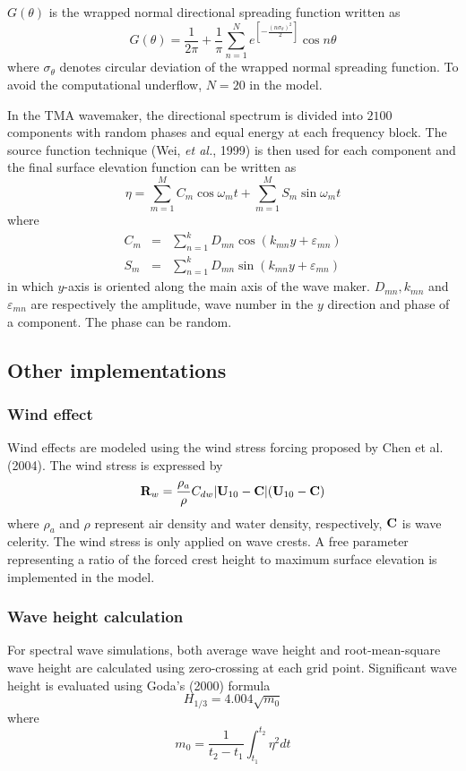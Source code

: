\documentclass[11pt]{article}
\newcommand{\be}{\begin{equation}}
\newcommand{\ee}{\end{equation}}
\newcommand{\ba}{\begin{eqnarray}}
\newcommand{\ea}{\end{eqnarray}}
\begin{document}
 

$G(\theta)$ is the wrapped normal directional spreading function written as
\be
G(\theta) = \frac{1}{2\pi} +\frac{1}{\pi} \sum^N_{n=1} e^{
[-\frac{(n\sigma_{\theta})^2}{2}]} \cos n\theta 
\ee
where $\sigma_{\theta}$ denotes circular deviation of the wrapped normal
spreading function. To avoid the computational underflow, $N =
20$ in the model.

In the TMA wavemaker, the directional spectrum is divided into $2100$ components with random
phases and equal energy at each frequency block. The source function technique
(Wei, {\em et al.}, 1999) is then used for each component and the final
surface elevation function can be written as
\be
\eta = \sum^M_{m=1} C_m \cos \omega _m t + \sum^M_{m=1} S_m \sin \omega _m t
\ee
where
\ba
C_m &=& \sum^k_{n=1} D_{mn} \cos (k_{mn}y + \varepsilon_{mn}) \\
\nonumber
S_m &=& \sum^k_{n=1} D_{mn} \sin (k_{mn}y + \varepsilon_{mn})
\ea
in which $y$-axis is oriented along the
main axis of the wave maker. $D_{mn}, k _{mn}$ and
$\varepsilon_{mn}$ are respectively the amplitude, wave number in the $y$ direction and phase of a
component. The phase can be random. 


\subsection{Other implementations}

\subsubsection{Wind effect}
Wind effects are modeled using the wind stress forcing proposed by Chen et al. (2004). The wind stress is expressed by
\be
{\bf R}_w = \frac{\rho_a}{\rho} C_{dw} |{\bf U}_{10} - {\bf C}| ({\bf U}_{10} - {\bf C})
\ee
where $\rho_a$ and $\rho$ represent air density and  water density, respectively, $\bf C$ is wave celerity.  The wind stress is only applied on wave crests. A free parameter representing a ratio of the forced crest height to maximum surface elevation is implemented in the model. 

\subsubsection{Wave height calculation}

For spectral wave simulations, both average wave height and root-mean-square wave height are calculated using zero-crossing at each grid point. Significant wave height is evaluated using Goda's (2000) formula
\be
H_{1/3} = 4.004\sqrt{m_0}
\label{qoda}
\ee 
where
\be
m_0 = \frac{1}{t_2-t_1} \int^{t_2}_{t_1} \eta^2 dt
\label{m0}
\ee
\end{document}
